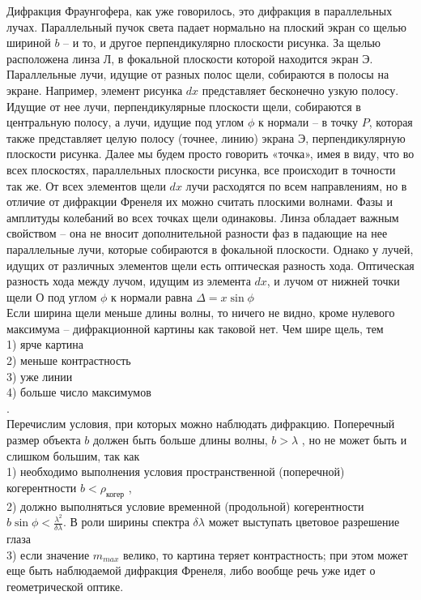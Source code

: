 \documentclass[__main__.tex]{subfiles}
\begin{document}
Дифракция Фраунгофера, как уже говорилось, это дифракция в параллельных лучах. Параллельный пучок света падает нормально на плоский экран со щелью шириной $b$ – и то, и другое перпендикулярно плоскости рисунка. За щелью расположена линза Л, в фокальной плоскости которой находится экран Э. Параллельные лучи, идущие от разных полос щели, собираются в полосы на экране. Например, элемент рисунка $dx$ представляет бесконечно узкую полосу. Идущие от нее лучи, перпендикулярные плоскости щели, собираются в центральную полосу, а лучи, идущие под углом $\phi$ к нормали – в точку $P$, которая также представляет целую полосу (точнее, линию) экрана Э, перпендикулярную плоскости рисунка. Далее мы будем просто говорить «точка», имея в виду, что во всех плоскостях, параллельных плоскости рисунка, все происходит в точности так же.
От всех элементов щели $dx$ лучи расходятся по всем направлениям, но в отличие от дифракции Френеля их можно считать плоскими волнами. Фазы и амплитуды колебаний во всех точках щели одинаковы.
Линза обладает важным свойством – она не вносит дополнительной разности фаз в падающие на нее параллельные лучи, которые собираются в фокальной
плоскости. Однако у лучей, идущих от различных элементов щели есть оптическая разность хода. Оптическая разность хода между лучом, идущим из элемента $dx$, и лучом от нижней точки щели О под углом $\phi$ к нормали равна $\Delta = x\sin\phi$\\
Если ширина щели меньше длины волны, то ничего не видно, кроме нулевого максимума – дифракционной картины как таковой нет.
Чем шире щель, тем\\
1) ярче картина\\
2) меньше контрастность\\
3) уже линии\\
4) больше число максимумов\\.
\\
Перечислим условия, при которых можно наблюдать дифракцию.
Поперечный размер объекта $b$ должен быть больше длины волны, $b > \lambda$ , но не может быть и слишком большим, так как\\
1) необходимо выполнения условия пространственной (поперечной) когерентности $b<\rho_{\text{когер}}$ ,\\
2) должно выполняться условие временной (продольной) когерентности $b\sin\phi < \frac{\lambda^2}{\delta \lambda}$. В роли ширины спектра $\delta\lambda$ может выступать цветовое разрешение глаза\\
3) если значение $m_{max}$ велико, то картина теряет контрастность; при этом может еще быть наблюдаемой дифракция Френеля, либо вообще речь уже
идет о геометрической оптике.
\end{document}
